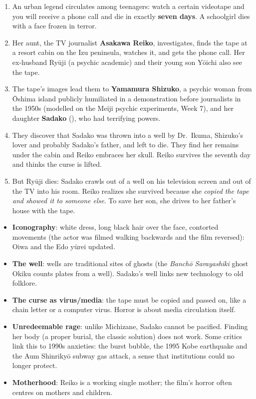 \begin{enumerate}
  \item An urban legend circulates among teenagers: watch a certain videotape and you will
        receive a phone call and die in exactly \textbf{seven days}. A schoolgirl dies with a
        face frozen in terror.
  \item Her aunt, the TV journalist \textbf{Asakawa Reiko}, investigates, finds the tape
        at a resort cabin on the Izu peninsula, watches it, and gets the phone call. Her
        ex-husband Ryūji (a psychic academic) and their young son Yōichi also see the tape.
  \item The tape's images lead them to \textbf{Yamamura Shizuko}, a psychic woman from
        Ōshima island publicly humiliated in a demonstration before journalists in the
        1950s (modelled on the Meiji psychic experiments, Week 7), and her daughter
        \textbf{Sadako} (), who had terrifying powers.
  \item They discover that Sadako was thrown into a well by Dr.\ Ikuma, Shizuko's lover and probably Sadako's father, and left
        to die. They find her remains under the cabin and Reiko embraces her skull. Reiko
        survives the seventh day and thinks the curse is lifted.
  \item But Ryūji dies: Sadako crawls out of a well on his television screen and out of the
        TV into his room. Reiko realizes she survived because she \emph{copied the tape and
        showed it to someone else}. To save her son, she drives to her father's house with
        the tape.
\end{enumerate}

\begin{important}
\begin{itemize}
  \item \textbf{Iconography}: white dress, long black hair over the face, contorted
        movements (the actor was filmed walking backwards and the film reversed): Oiwa and
        the Edo yūrei updated.
  \item \textbf{The well}: wells are traditional sites of ghosts (the \emph{Banchō
        Sarayashiki} ghost Okiku counts plates from a well). Sadako's well links new
        technology to old folklore.
  \item \textbf{The curse as virus/media}: the tape must be copied and passed on, like a
        chain letter or a computer virus. Horror is about media circulation itself.
  \item \textbf{Unredeemable rage}: unlike Michizane, Sadako cannot be pacified. Finding
        her body (a proper burial, the classic solution) does not work. Some critics link
        this to 1990s anxieties: the burst bubble, the 1995 Kobe earthquake and the Aum
        Shinrikyō subway gas attack, a sense that institutions could no longer protect.
  \item \textbf{Motherhood}: Reiko is a working single mother; the film's horror often
        centres on mothers and children.
\end{itemize}
\end{important}

